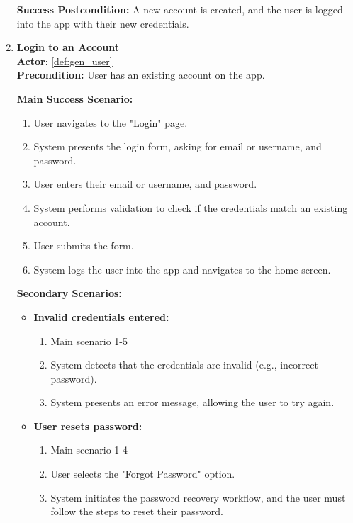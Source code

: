 \documentclass{article}
\begin{document}
\begin{enumerate}[label=\textbf{UC\arabic*}]
          \textbf{Success Postcondition:} A new account is created, and the user is logged into the app with their new credentials.

    \item \label{uc:24} \textbf{Login to an Account} \\
          \textbf{Actor}: \ref{def:gen_user} \\
          \textbf{Precondition:} User has an existing account on the app.

          \textbf{Main Success Scenario:}
          \begin{enumerate}[label=\textbf{\arabic*.}]
              \item User navigates to the "Login" page.
              \item System presents the login form, asking for email or username, and password.
              \item User enters their email or username, and password.
              \item System performs validation to check if the credentials match an existing account.
              \item User submits the form.
              \item System logs the user into the app and navigates to the home screen.
          \end{enumerate}

          \textbf{Secondary Scenarios:}
          \begin{itemize}
              \item[{}] \textbf{Invalid credentials entered:}
                    \begin{enumerate}[label=\textbf{\arabic*.}]
                        \item Main scenario 1-5
                        \item System detects that the credentials are invalid (e.g., incorrect password).
                        \item System presents an error message, allowing the user to try again.
                    \end{enumerate}

              \item[{}] \textbf{User resets password:}
                    \begin{enumerate}[label=\textbf{\arabic*.}]
                        \item Main scenario 1-4
                        \item User selects the "Forgot Password" option.
                        \item System initiates the password recovery workflow, and the user must follow the steps to reset their password.
                    \end{enumerate}


\end{itemize}
\end{enumerate}
\end{document}
